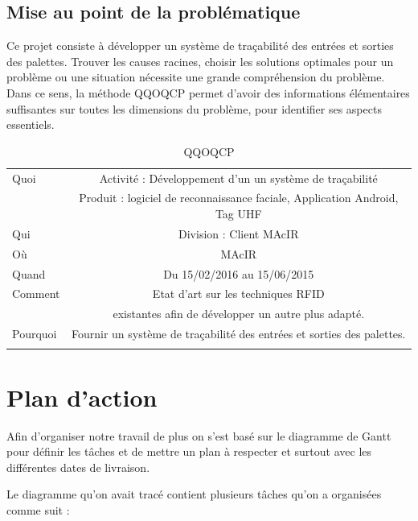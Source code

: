 \documentclass[11pt, a4paper, twoside]{book}
\begin{document}
\subsection{Mise au point de la problématique}
Ce projet consiste à développer un système de traçabilité des entrées et sorties des palettes. Trouver les causes racines, choisir les solutions optimales pour un problème ou une situation nécessite une grande compréhension du problème. Dans ce sens, la méthode QQOQCP permet d'avoir des informations élémentaires suffisantes sur toutes les dimensions du problème, pour identifier ses aspects essentiels.\\


\begin{longtable}{|l|c|}
  \hline
  Quoi & Activité : Développement d’un un système de traçabilité \\
       &  Produit : logiciel de reconnaissance faciale, Application Android, Tag UHF \\
  \hline
  Qui & Division : Client MAcIR\\
  \hline
  Où & MAcIR\\
  \hline
  Quand & Du 15/02/2016 au 15/06/2015\\
  \hline
  Comment & Etat d’art sur les techniques RFID \\
          &  existantes afin de développer un autre plus adapté.\\
  \hline
  Pourquoi & Fournir un système de traçabilité des entrées et sorties des palettes.\\
  \hline
  
\caption{QQOQCP}
\end{longtable}


\section{Plan d’action}
Afin d’organiser notre travail de plus on s’est basé sur le diagramme de Gantt pour définir les tâches et de mettre un plan à respecter et surtout avec les différentes dates de livraison.

Le diagramme qu’on avait tracé contient plusieurs tâches qu’on a organisées comme suit :
\end{document}
